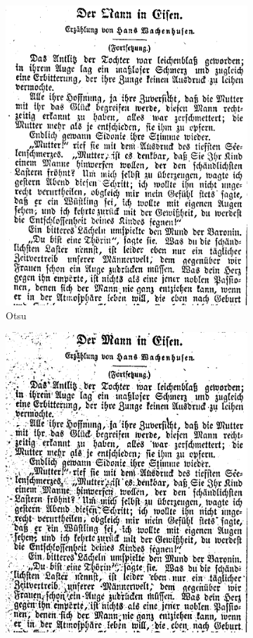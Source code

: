 \documentclass[12pt,a4paper]{article}
\begin{document}
\begin{figure}[h!]
\begin{subfigure}[b]{0.3\textwidth}
        \includegraphics[width=\textwidth]{otsu2.png}
        \caption{Otsu}
    \end{subfigure}
    \hfill
    \begin{subfigure}[b]{0.3\textwidth}
        \includegraphics[width=\textwidth]{sauvola2.png}

\end{subfigure}
\end{figure}
\end{document}
